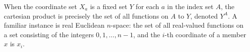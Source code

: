 When the coordinate set $X_a$ is a fixed set $Y$ for each $a$ in the index set $A$, the cartesian product is precisely the set of all functions on $A$ to $Y$, denoted $Y^A$. A familiar instance is real Euclidean $n$-space: the set of all real-valued functions on a set consisting of the integers $0, 1, \dots, n-1$, and the $i$-th coordinate of a member $x$ is $x_i$.
